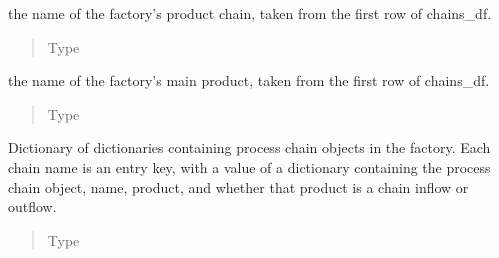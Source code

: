 \documentclass[a4paper,10pt,english]{sphinxmanual}
\begin{document}
\begin{fulllineitems}
\begin{fulllineitems}
\begin{quote}
\begin{description}
\end{description}\end{quote}

\end{fulllineitems}


\begin{fulllineitems}
\label{\detokenize{factory:factory.Factory.main_chain}}
the name of the factory’s product chain, taken from
the first row of chains\_df.
\begin{quote}\begin{description}
\item[{Type}] \leavevmode
{}

\end{description}\end{quote}

\end{fulllineitems}


\begin{fulllineitems}
\label{\detokenize{factory:factory.Factory.main_product}}
the name of the factory’s main product, taken from
the first row of chains\_df.
\begin{quote}\begin{description}
\item[{Type}] \leavevmode
{}

\end{description}\end{quote}

\end{fulllineitems}


\begin{fulllineitems}
\label{\detokenize{factory:factory.Factory.chain_dict}}
Dictionary of dictionaries containing process chain
objects in the factory. Each chain name is an entry key, with a
value of a dictionary containing the process chain object, name,
product, and whether that product is a chain inflow or outflow.
\begin{quote}\begin{description}
\item[{Type}] \leavevmode
{}


\end{description}
\end{quote}
\end{fulllineitems}
\end{fulllineitems}
\end{document}
